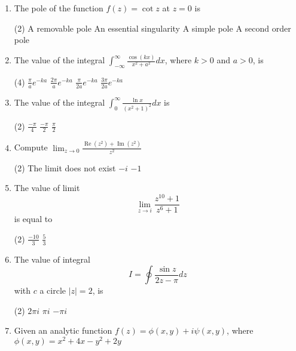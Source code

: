 \begin{enumerate}[label=\color{ocre}\textbf{\arabic*.}]
	{}
	\item The pole of the function $f(z)=\cot z$ at $z=0$ is
	{}
	\begin{tasks}(2)
		\task[\textbf{A.}] A removable pole
		\task[\textbf{B.}] An essential singularity
		\task[\textbf{C.}]  A simple pole
		\task[\textbf{D.}] A second order pole
	\end{tasks}
	\item The value of the integral $\int_{-\infty}^{\infty} \frac{\cos (k x)}{x^{2}+a^{2}} d x$, where $k>0$ and $a>0$, is
	{}
	\begin{tasks}(4)
		\task[\textbf{A.}] $\frac{\pi}{a} e^{-k a}$
		\task[\textbf{B.}] $\frac{2 \pi}{a} e^{-k a}$
		\task[\textbf{C.}] $\frac{\pi}{2 a} e^{-k a}$
		\task[\textbf{D.}] $\frac{3 \pi}{2 a} e^{-k a}$
	\end{tasks}
\item The value of the integral $\int_{0}^{\infty} \frac{\ln x}{\left(x^{2}+1\right)^{2}} d x$ is
{}
\begin{tasks}(2)
	\task[\textbf{b.}]$\frac{-\pi}{4}$
	\task[\textbf{c.}] $\frac{-\pi}{2}$
	\task[\textbf{d.}] $\frac{\pi}{2}$
\end{tasks}
\item Compute $\lim _{z \rightarrow 0} \frac{\operatorname{Re}\left(z^{2}\right)+\operatorname{Im}\left(z^{2}\right)}{z^{2}}$
{}
\begin{tasks}(2)
	\task[\textbf{a.}] The limit does not exist
	\task[\textbf{c.}]$-i$
	\task[\textbf{d.}] $-1$
\end{tasks}
\item The value of limit
$$
\lim _{z \rightarrow i} \frac{z^{10}+1}{z^{6}+1}
$$
is equal to
{}
\begin{tasks}(2)
	\task[\textbf{c.}] $\frac{-10}{3}$
	\task[\textbf{d.}] $\frac{5}{3}$
\end{tasks}
\item The value of integral
$$
I=\oint \frac{\sin z}{2 z-\pi} d z
$$
with $c$ a circle $|z|=2$, is
{}
\begin{tasks}(2)
	\task[\textbf{b.}]$2 \pi i$
	\task[\textbf{c.}] $\pi i$
	\task[\textbf{d.}]  $-\pi i$
\end{tasks}
\item Given an analytic function $f(z)=\phi(x, y)+i \psi(x, y)$, where $\phi(x, y)=x^{2}+4 x-y^{2}+2 y$

\end{enumerate}
